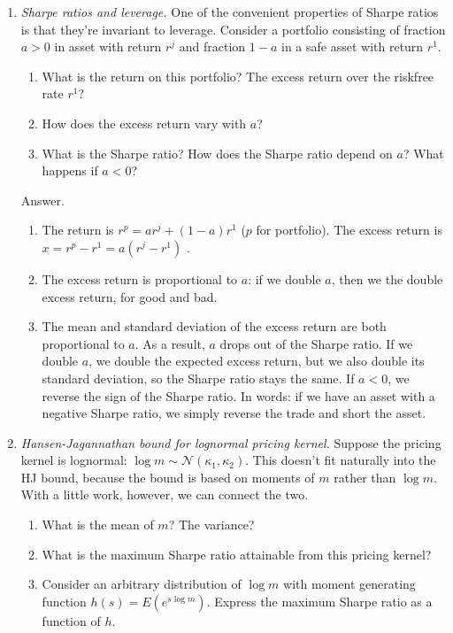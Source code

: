 \documentclass[11pt]{article}
\begin{document}
\begin{enumerate}
\item {\it Sharpe ratios and leverage.\/}
One of the convenient properties of Sharpe ratios is that they're invariant to leverage.
Consider a portfolio consisting of fraction $a>0$ in asset with return $r^j$ and
fraction $1-a$ in a safe asset with return $r^1$.
%
\begin{enumerate}
\item What is the return on this portfolio?
The excess return over the riskfree rate $r^1$?
\item How does the excess return vary with $a$?
\item What is the Sharpe ratio?
How does the Sharpe ratio depend on $a$?
What happens if $a<0$?
\end{enumerate}
%
Answer.
\begin{enumerate}
\item The return is $r^p = a r^j + (1-a) r^1$ ($p$ for portfolio).
The excess return is $x = r^p - r^1 = a (r^j - r^1)$ .
\item The excess return is proportional to $a$:  if we double $a$,
then we the double excess return, for good and bad.
\item The mean and standard deviation of the excess return
are both proportional to $a$.
As a result, $a$ drops out of the Sharpe ratio.
If we double $a$, we double the expected excess return,
but we also double its standard deviation,
so the Sharpe ratio stays the same.
If $a<0$, we reverse the sign of the Sharpe ratio.
In words:  if we have an asset with a negative Sharpe ratio,
we simply reverse the trade and short the asset.
\end{enumerate}

\item {\it Hansen-Jagannathan bound for lognormal pricing kernel.\/}
Suppose the pricing kernel is lognormal:
$ \log m \sim \mathcal{N}(\kappa_1,\kappa_2)$.
This doesn't fit naturally into the HJ bound, because the bound
is based on moments of $m$ rather than $\log m$.
With a little work, however, we can connect the two.
%
\begin{enumerate}
\item What is the mean of $m$?  The variance?
\item What is the maximum Sharpe ratio attainable from this pricing kernel?
\item Consider an arbitrary distribution of $\log m$ with
moment generating function
$ h(s) = E (e^{s \log m} )$.
Express the maximum Sharpe ratio as a function of $h$.
\end{enumerate}


\end{enumerate}
\end{document}
